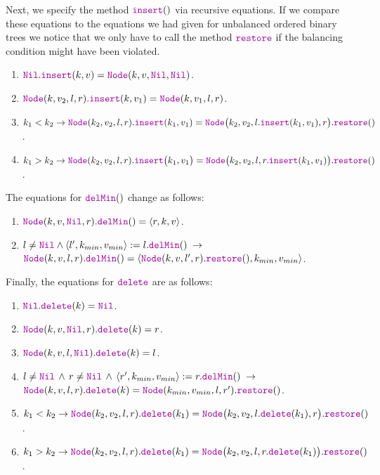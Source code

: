 Next, we specify the method  $\mytt{insert}()$ via recursive equations.
If we compare these equations to the equations we had given for unbalanced ordered binary trees we
notice that we only have to call the method $\mytt{restore}$ if the balancing condition might have
been violated.
\begin{enumerate}
\item $\mytt{Nil}.\mytt{insert}(k,v) = \mytt{Node}(k,v, \mytt{Nil}, \mytt{Nil})$.  
\item $\mytt{Node}(k, v_2, l, r).\mytt{insert}(k,v_1) = \mytt{Node}(k, v_1, l, r)$.
\item $k_1 < k_2 \rightarrow 
          \mytt{Node}(k_2, v_2, l, r).\mytt{insert}(k_1, v_1) =
          \mytt{Node}\bigl(k_2, v_2, l.\mytt{insert}(k_1,v_1), r\bigr).\mytt{restore}()$.
\item $k_1 > k_2 \rightarrow 
         \mytt{Node}(k_2, v_2, l, r).\mytt{insert}\bigl(k_1, v_1\bigr) = 
         \mytt{Node}\bigl(k_2, v_2, l, r.\mytt{insert}(k_1,v_1)\bigr).\mytt{restore}()$.
\end{enumerate}
The equations for  $\mytt{delMin}()$ change as follows:
\begin{enumerate}
\item $\mytt{Node}(k, v, \mytt{Nil}, r).\mytt{delMin}() = \langle r, k, v \rangle$.
\item $l\not= \mytt{Nil} \wedge \langle l',k_{min}, v_{min}\rangle := l.\mytt{delMin}() 
       \;\rightarrow$ \\[0.2cm]
       \hspace*{1.3cm} 
       $\mytt{Node}(k, v, l, r).\mytt{delMin}() = 
        \langle \mytt{Node}(k, v, l', r).\mytt{restore}(), k_{min}, v_{min} \rangle$.
\end{enumerate}
Finally, the equations for $\mytt{delete}$ are as follows:
\begin{enumerate}
\item $\mytt{Nil}.\mytt{delete}(k) = \mytt{Nil}$.
\item $\mytt{Node}(k,v,\mytt{Nil},r).\mytt{delete}(k) = r$.
\item $\mytt{Node}(k,v,l,\mytt{Nil}).\mytt{delete}(k) = l$.
\item $l \not= \mytt{Nil} \,\wedge\, r \not= \mytt{Nil} \,\wedge\, 
       \langle r',k_{min}, v_{min} \rangle := r.\mytt{delMin}()  \;\rightarrow$ \\[0.2cm]
      \hspace*{1.3cm}
      $\mytt{Node}(k,v,l,r).\mytt{delete}(k) = \mytt{Node}(k_{min},v_{min},l,r').\mytt{restore}()$.
\item $k_1 < k_2 \rightarrow \mytt{Node}(k_2,v_2,l,r).\mytt{delete}(k_1) = 
       \mytt{Node}\bigl(k_2,v_2,l.\mytt{delete}(k_1),r\bigr).\mytt{restore}()$.
\item $k_1 > k_2 \rightarrow \mytt{Node}(k_2,v_2,l,r).\mytt{delete}(k_1) = 
         \mytt{Node}\bigl(k_2,v_2,l,r.\mytt{delete}(k_1)\bigr).\mytt{restore}()$.
\end{enumerate}


